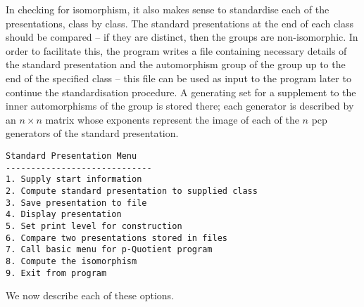 \documentclass[12pt]{article}
\begin{document}
In checking for isomorphism, it also makes sense
to standardise each of the presentations,
class by class. The standard presentations
at the end of each class should be compared --
if they are distinct, then the groups are non-isomorphic.
In order to facilitate this, the program writes a 
file containing necessary details of the standard presentation and the 
automorphism group of the group up to the end of the specified class 
-- this file can be used as input to the program later to
continue the standardisation procedure. 
A generating set for a supplement to the inner automorphisms of the
group is stored there; each generator is described by  an $n \times n$
 matrix whose exponents represent the image of each of the $n$
pcp generators of the standard presentation.

\begin{verbatim}
Standard Presentation Menu
-----------------------------
1. Supply start information
2. Compute standard presentation to supplied class
3. Save presentation to file
4. Display presentation
5. Set print level for construction
6. Compare two presentations stored in files
7. Call basic menu for p-Quotient program
8. Compute the isomorphism
9. Exit from program
\end{verbatim}

We now describe each of these options.
\end{document}
